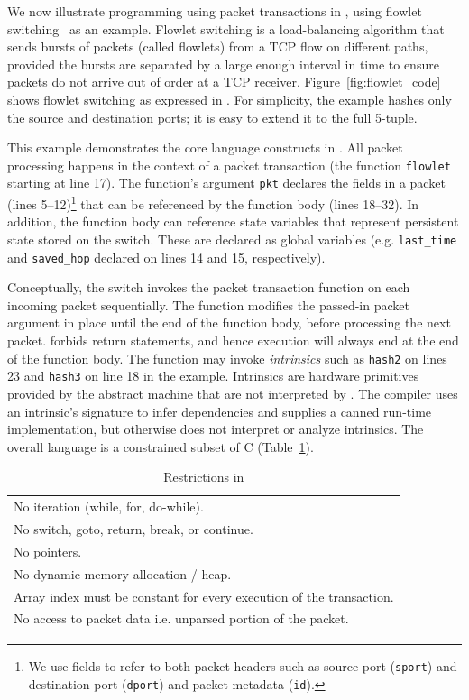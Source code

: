 We now illustrate programming using packet transactions in \pktlanguage, using
flowlet switching~\cite{flowlets} as an example. Flowlet switching is a
load-balancing algorithm that sends bursts of packets (called flowlets) from a
TCP flow on different paths, provided the bursts are separated by a large
enough interval in time to ensure packets do not arrive out of order at a TCP
receiver. Figure~\ref{fig:flowlet_code} shows flowlet switching as expressed in
\pktlanguage. For simplicity, the example hashes only the source and
destination ports; it is easy to extend it to the full 5-tuple.

This example demonstrates the core language constructs in \pktlanguage. All
packet processing happens in the context of a packet transaction (the function
\texttt{flowlet} starting at line 17). The function's argument {\tt pkt} declares the
fields in a packet (lines 5--12)\footnote{We use fields to refer to both packet
headers such as source port ({\tt sport}) and destination port ({\tt dport})
and packet metadata ({\tt id}).} that can be referenced by the function body
(lines 18--32).  In addition, the function body can reference state variables
that represent persistent state stored on the switch. These are declared as
global variables (e.g. \texttt{last\_time} and \texttt{saved\_hop} declared on
lines 14 and 15, respectively).

Conceptually, the switch invokes the packet transaction function on each
incoming packet sequentially. The function modifies the passed-in packet
argument in place until the end of the function body, before processing the
next packet.  \pktlanguage forbids return statements, and hence execution
will always end at the end of the function body. The function may invoke
\textit{intrinsics} such as \texttt{hash2} on lines 23 and \texttt{hash3} on
line 18 in the example.  Intrinsics are hardware primitives provided by the
abstract machine that are not interpreted by \pktlanguage. The \pktlanguage
compiler uses an intrinsic's signature to infer dependencies and supplies a
canned run-time implementation, but otherwise does not interpret or analyze
intrinsics. The overall language is a constrained subset of C (Table~\ref{tab:restrict}).
\begin{table}
  \begin{tabular}{p{}}
    No iteration (while, for, do-while).\\
    No switch, goto, return, break, or continue.\\
    No pointers.\\
    No dynamic memory allocation / heap.\\
    Array index must be constant for every execution of the transaction.\\
    No access to packet data i.e. unparsed portion of the packet.\\
  \end{tabular}
  \caption{Restrictions in \pktlanguage}
  \label{tab:restrict}
\end{table}

